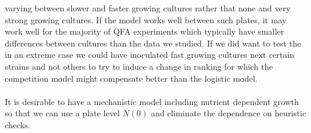 varying between slower and faster growing cultures rather that none
and very strong growing cultures. If the model works well between such
plates, it may work well for the majority of QFA experiments which
typically have smaller differences between cultures than the data we
studied. If we did want to test the in an extreme case we could have
inoculated fast growing cultures next certain strains and not others
to try to induce a change in ranking for which the competition model
might compensate better than the logistic model.
\\\\
It is desirable to have a mechanistic model including nutrient
dependent growth so that we can use a plate level \(N(0)\) and
eliminate the dependence on heuristic checks.







